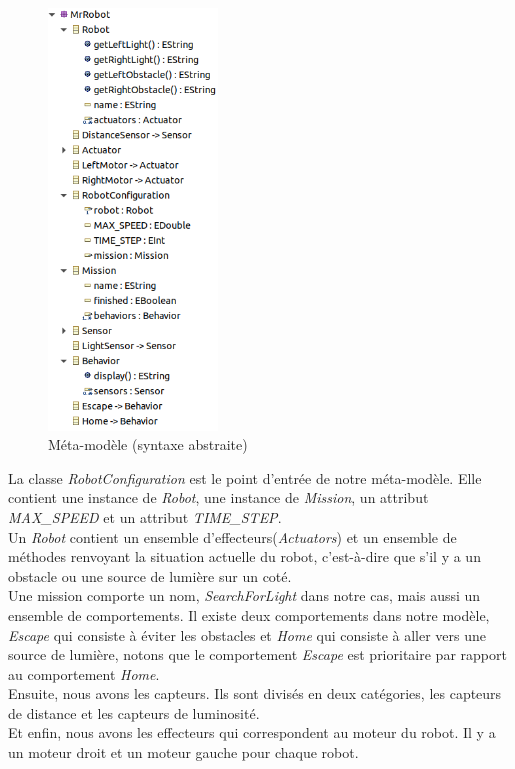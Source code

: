 \documentclass[a4paper,12pt]{article}
\begin{document}
\begin{figure}[!h]  
    \includegraphics[width=4.5cm]{abstract_model.png}
    \caption{Méta-modèle (syntaxe abstraite)}
\end{figure}
\vspace{0.5cm}
La classe \textit{RobotConfiguration} est le point d'entrée de notre méta-modèle. Elle contient une instance de \textit{Robot}, une instance de \textit{Mission}, un attribut \textit{MAX\_{}SPEED} et un attribut \textit{TIME\_{}STEP}.
\\Un \textit{Robot} contient un ensemble d'effecteurs(\textit{Actuators}) et un ensemble de méthodes renvoyant la situation actuelle du robot, c'est-à-dire que s'il y a un obstacle ou une source de lumière sur un coté.
\\Une mission comporte un nom, \textit{SearchForLight} dans notre cas, mais aussi un ensemble de comportements. Il existe deux comportements dans notre modèle, \textit{Escape} qui consiste à éviter les obstacles et \textit{Home} qui consiste à aller vers une source de lumière, notons que le comportement \textit{Escape} est prioritaire par rapport au comportement \textit{Home}.
\\Ensuite, nous avons les capteurs. Ils sont divisés en deux catégories, les capteurs de distance et les capteurs de luminosité.
\\Et enfin, nous avons les effecteurs qui correspondent au moteur du robot. Il y a un moteur droit et un moteur gauche pour chaque robot.
\newpage
\end{document}
